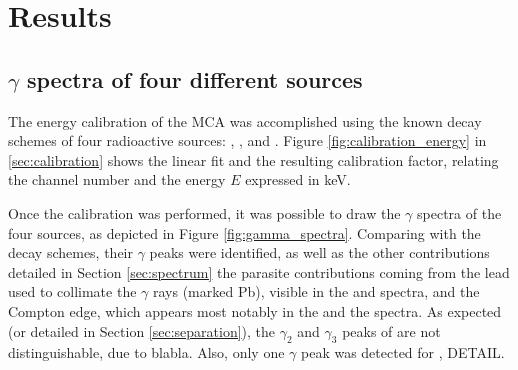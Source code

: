 \section{Results}
\subsection{$\gamma$ spectra of four different sources}
The energy calibration of the MCA was accomplished using the known decay 
schemes\cite{notice_generale} of four radioactive sources: 
\cesium, \cobalt, \lead and \hafnium.
Figure \ref{fig:calibration_energy} in \autoref{sec:calibration} 
shows the linear fit and the resulting calibration factor, 
relating the channel number and the energy $E$ expressed in keV.

Once the calibration was performed, it was possible to draw the $\gamma$ spectra 
of the four sources, as depicted in Figure \ref{fig:gamma_spectra}.
Comparing with the decay schemes, their $\gamma$ peaks were identified,
as well as the other contributions detailed in Section \ref{sec:spectrum}
the parasite contributions coming from the lead used to collimate 
the $\gamma$ rays (marked Pb), visible in the \cesium and \hafnium spectra, 
and the Compton edge, which appears most notably in the \cesium 
and the \lead spectra.
As expected (or detailed in Section \ref{sec:separation}), the $\gamma_2$ and $\gamma_3$ peaks of \cobalt are not distinguishable, due to blabla.
Also, only one $\gamma$ peak was detected for \hafnium, DETAIL.

